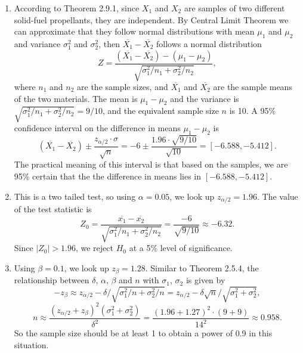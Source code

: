 \documentclass[11pt,a4paper]{article}
\begin{document}
\begin{enumerate}[label=\roman*)]
\item
According to Theorem 2.9.1, since $X_1$ and $X_2$ are samples of two different solid-fuel propellants, they are independent. By Central Limit Theorem we can approximate that they follow normal distributions with mean $\mu_1$ and $\mu_2$ and variance $\sigma_1^2$ and $\sigma_2^2$, then $\overline{X_1}-\overline{X_2}$ follows a normal distribution
$$Z=\frac{(\overline{X_1}-\overline{X_2})-(\mu_1-\mu_2)}{\sqrt{\sigma_1^2/n_1+\sigma_2^2/n_2}},$$ 
where $n_1$ and $n_2$ are the sample sizes, and $\overline{X_1}$ and $\overline{X_2}$ are the sample means of the two materials. The mean is $\mu_1-\mu_2$ and the variance is $\sqrt{\sigma_1^2/n_1+\sigma_2^2/n_2}=9/10$, and the equivalent sample size $n$ is 10. A 95\% confidence interval on the difference in means $\mu_1-\mu_2$ is
$$(\overline{X_1}-\overline{X_2})\pm\frac{z_{\alpha/2}\cdot \sigma}{\sqrt{n}}=-6\pm\frac{1.96\cdot\sqrt{9/10}}{\sqrt{10}}=[-6.588,-5.412].$$
The practical meaning of this interval is that based on the samples, we are 95\% certain that the the difference in means lies in $[-6.588,-5.412]$.
\item
This is a two tailed test, so using $\alpha=0.05$, we look up $z_{\alpha/2}=1.96$. The value of the test statistic is
$$Z_0=\frac{\overline{x_1}-\overline{x_2}}{\sqrt{\sigma_1^2/n_1+\sigma_2^2/n_2}}=\frac{-6}{\sqrt{9/10}}\approx-6.32.$$
Since $|Z_0|>1.96$, we reject $H_0$ at a 5\% level of significance.
\item
Using $\beta=0.1$, we look up $z_\beta=1.28$. Similar to Theorem 2.5.4, the relationship between $\delta$, $\alpha$, $\beta$ and $n$ with $\sigma_1$, $\sigma_2$ is given by
$$-z_\beta\approx z_{\alpha/2}-\delta/\sqrt{\sigma_1^2/n+\sigma_2^2/n}=z_{\alpha/2}-\delta\sqrt{n}/\sqrt{\sigma_1^2+\sigma_2^2},$$
$$n\approx\frac{(z_{\alpha/2}+z_\beta)^2(\sigma_1^2+\sigma_2^2)}{\delta^2}=\frac{(1.96+1.27)^2\cdot(9+9)}{14^2}\approx0.958.$$
So the sample size should be at least 1 to obtain a power of 0.9 in this situation.
\end{enumerate}

\subsection{}
\end{document}
